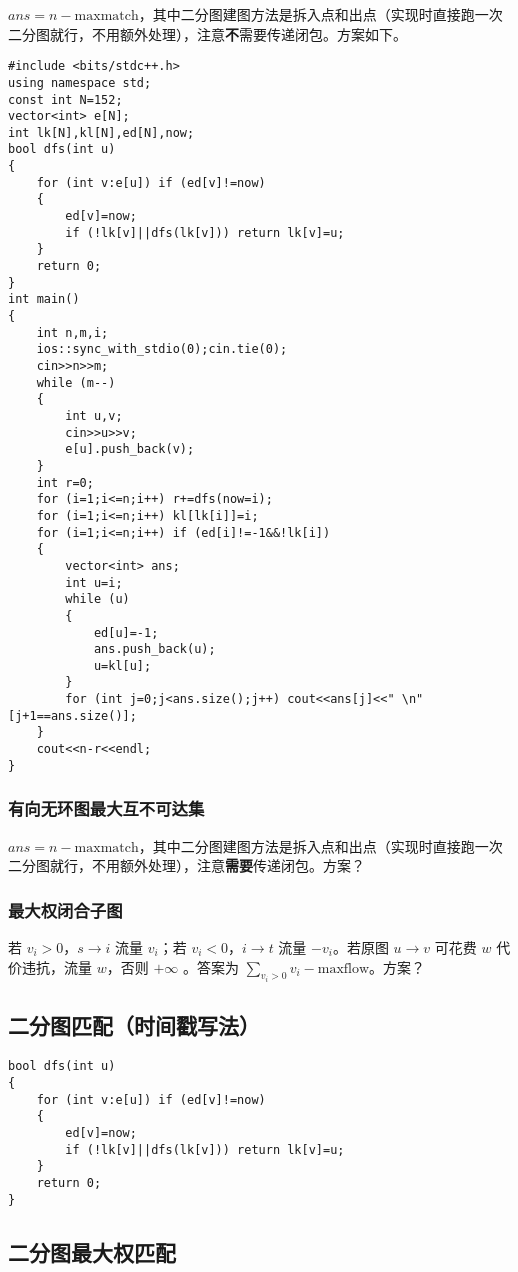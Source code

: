 \documentclass[12pt]{ctexart}
\begin{document}
$ans=n-\text{maxmatch}$，其中二分图建图方法是拆入点和出点（实现时直接跑一次二分图就行，不用额外处理），注意\textbf{不}需要传递闭包。方案如下。

\begin{lstlisting}
#include <bits/stdc++.h>
using namespace std;
const int N=152;
vector<int> e[N];
int lk[N],kl[N],ed[N],now;
bool dfs(int u)
{
	for (int v:e[u]) if (ed[v]!=now)
	{
		ed[v]=now;
		if (!lk[v]||dfs(lk[v])) return lk[v]=u;
	}
	return 0;
}
int main()
{
	int n,m,i;
	ios::sync_with_stdio(0);cin.tie(0);
	cin>>n>>m;
	while (m--)
	{
		int u,v;
		cin>>u>>v;
		e[u].push_back(v);
	}
	int r=0;
	for (i=1;i<=n;i++) r+=dfs(now=i);
	for (i=1;i<=n;i++) kl[lk[i]]=i;
	for (i=1;i<=n;i++) if (ed[i]!=-1&&!lk[i])
	{
		vector<int> ans;
		int u=i;
		while (u)
		{
			ed[u]=-1;
			ans.push_back(u);
			u=kl[u];
		}
		for (int j=0;j<ans.size();j++) cout<<ans[j]<<" \n"[j+1==ans.size()];
	}
	cout<<n-r<<endl;
}
\end{lstlisting}

\subsubsection{有向无环图最大互不可达集}

$ans=n-\text{maxmatch}$，其中二分图建图方法是拆入点和出点（实现时直接跑一次二分图就行，不用额外处理），注意\textbf{需要}传递闭包。方案？

\subsubsection{最大权闭合子图}

若 $v_i>0$，$s\to i$ 流量 $v_i$；若 $v_i<0$，$i\to t$ 流量 $-v_i$。若原图 $u\to v$ 可花费 $w$ 代价违抗，流量 $w$，否则 $+\infty$ 。答案为 $\sum\limits_{v_i>0} v_i-\text{maxflow}$。方案？

\subsection{二分图匹配（时间戳写法）}

\begin{lstlisting}
bool dfs(int u)
{
	for (int v:e[u]) if (ed[v]!=now)
	{
		ed[v]=now;
		if (!lk[v]||dfs(lk[v])) return lk[v]=u;
	}
	return 0;
}
\end{lstlisting}

\subsection{二分图最大权匹配}
\end{document}
